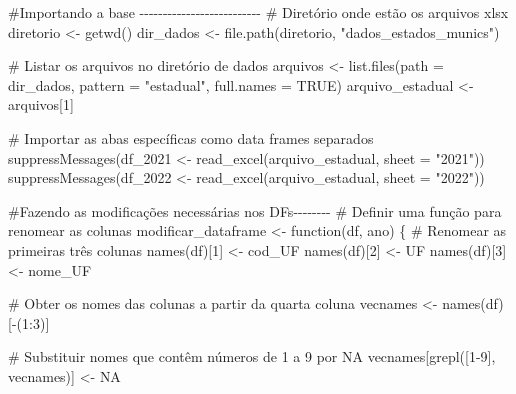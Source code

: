 \documentclass[
  letterpaper,
  DIV=11,
  numbers=noendperiod]{scrartcl}
\newenvironment{Shaded}{\begin{snugshade}}{\end{snugshade}}
\newcommand{\AttributeTok}[1]{\textcolor[rgb]{0.40,0.45,0.13}{#1}}
\newcommand{\CommentTok}[1]{\textcolor[rgb]{0.37,0.37,0.37}{#1}}
\newcommand{\ConstantTok}[1]{\textcolor[rgb]{0.56,0.35,0.01}{#1}}
\newcommand{\ControlFlowTok}[1]{\textcolor[rgb]{0.00,0.23,0.31}{#1}}
\newcommand{\DecValTok}[1]{\textcolor[rgb]{0.68,0.00,0.00}{#1}}
\newcommand{\FunctionTok}[1]{\textcolor[rgb]{0.28,0.35,0.67}{#1}}
\newcommand{\NormalTok}[1]{\textcolor[rgb]{0.00,0.23,0.31}{#1}}
\newcommand{\OtherTok}[1]{\textcolor[rgb]{0.00,0.23,0.31}{#1}}
\newcommand{\SpecialCharTok}[1]{\textcolor[rgb]{0.37,0.37,0.37}{#1}}
\newcommand{\StringTok}[1]{\textcolor[rgb]{0.13,0.47,0.30}{#1}}
\begin{document}
\begin{Shaded}
\begin{Highlighting}[]
\CommentTok{\#Importando a base {-}{-}{-}{-}{-}{-}{-}{-}{-}{-}{-}{-}{-}{-}{-}{-}{-}{-}{-}{-}{-}{-}{-}{-}{-}{-}}
\CommentTok{\# Diretório onde estão os arquivos xlsx}
\NormalTok{diretorio }\OtherTok{\textless{}{-}} \FunctionTok{getwd}\NormalTok{()}
\NormalTok{dir\_dados }\OtherTok{\textless{}{-}} \FunctionTok{file.path}\NormalTok{(diretorio, }\StringTok{"dados\_estados\_munics"}\NormalTok{)}

\CommentTok{\# Listar os arquivos no diretório de dados}
\NormalTok{arquivos }\OtherTok{\textless{}{-}} \FunctionTok{list.files}\NormalTok{(}\AttributeTok{path =}\NormalTok{ dir\_dados, }\AttributeTok{pattern =} \StringTok{"estadual"}\NormalTok{, }\AttributeTok{full.names =} \ConstantTok{TRUE}\NormalTok{)}
\NormalTok{arquivo\_estadual }\OtherTok{\textless{}{-}}\NormalTok{ arquivos[}\DecValTok{1}\NormalTok{]}

\CommentTok{\# Importar as abas específicas como data frames separados}
\FunctionTok{suppressMessages}\NormalTok{(df\_2021 }\OtherTok{\textless{}{-}} \FunctionTok{read\_excel}\NormalTok{(arquivo\_estadual, }\AttributeTok{sheet =} \StringTok{"2021"}\NormalTok{))}
\FunctionTok{suppressMessages}\NormalTok{(df\_2022 }\OtherTok{\textless{}{-}} \FunctionTok{read\_excel}\NormalTok{(arquivo\_estadual, }\AttributeTok{sheet =} \StringTok{"2022"}\NormalTok{))}

\CommentTok{\#Fazendo as modificações necessárias nos DFs{-}{-}{-}{-}{-}{-}{-}{-}}
\CommentTok{\# Definir uma função para renomear as colunas}
\NormalTok{modificar\_dataframe }\OtherTok{\textless{}{-}} \ControlFlowTok{function}\NormalTok{(df, ano) \{}
  \CommentTok{\# Renomear as primeiras três colunas}
  \FunctionTok{names}\NormalTok{(df)[}\DecValTok{1}\NormalTok{] }\OtherTok{\textless{}{-}} \StringTok{\textquotesingle{}cod\_UF\textquotesingle{}}
  \FunctionTok{names}\NormalTok{(df)[}\DecValTok{2}\NormalTok{] }\OtherTok{\textless{}{-}} \StringTok{\textquotesingle{}UF\textquotesingle{}}
  \FunctionTok{names}\NormalTok{(df)[}\DecValTok{3}\NormalTok{] }\OtherTok{\textless{}{-}} \StringTok{\textquotesingle{}nome\_UF\textquotesingle{}}
  
  \CommentTok{\# Obter os nomes das colunas a partir da quarta coluna}
\NormalTok{  vecnames }\OtherTok{\textless{}{-}} \FunctionTok{names}\NormalTok{(df)[}\SpecialCharTok{{-}}\NormalTok{(}\DecValTok{1}\SpecialCharTok{:}\DecValTok{3}\NormalTok{)]}
  
  \CommentTok{\# Substituir nomes que contêm números de 1 a 9 por NA}
\NormalTok{  vecnames[}\FunctionTok{grepl}\NormalTok{(}\StringTok{\textquotesingle{}[1{-}9]\textquotesingle{}}\NormalTok{, vecnames)] }\OtherTok{\textless{}{-}} \ConstantTok{NA}
  

\end{Highlighting}
\end{Shaded}
\end{document}
